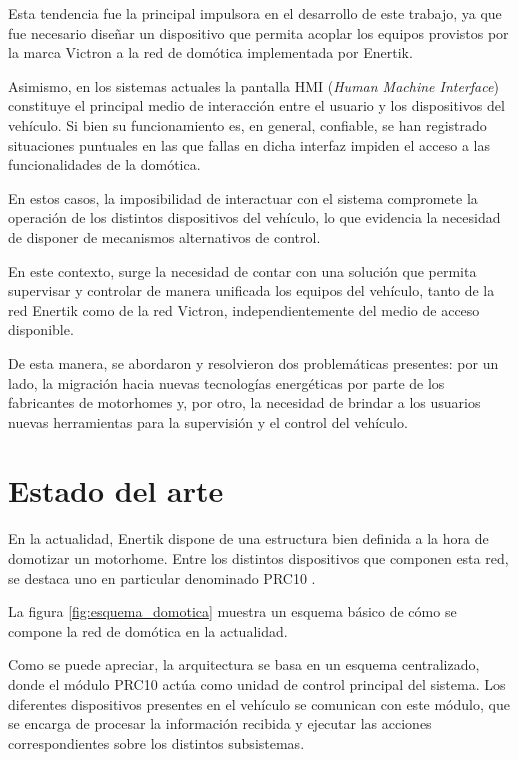 Esta tendencia fue la principal impulsora en el desarrollo de este trabajo, ya que fue necesario diseñar un
dispositivo que permita acoplar los equipos provistos por la marca Victron a la red de domótica implementada por Enertik.

Asimismo, en los sistemas actuales la pantalla HMI (\textit{Human Machine Interface}) constituye el principal medio de interacción entre el usuario y los dispositivos del vehículo. Si bien su funcionamiento es, en general, confiable, se han registrado situaciones puntuales en las que fallas en dicha interfaz impiden el acceso a las funcionalidades de la domótica. 

En estos casos, la imposibilidad de interactuar con el sistema compromete la operación de los distintos dispositivos del vehículo, lo que evidencia la necesidad de disponer de mecanismos alternativos de control.

En este contexto, surge la necesidad de contar con una solución que permita supervisar y controlar de manera unificada los equipos del vehículo, tanto de la red Enertik como de la red Victron, independientemente del medio de acceso disponible.

De esta manera, se abordaron y resolvieron dos problemáticas presentes: por un lado, la migración hacia nuevas tecnologías energéticas por parte de los fabricantes de motorhomes y, por otro, la necesidad de brindar a los usuarios nuevas herramientas para la supervisión y el control del vehículo.

\section{Estado del arte}
\label{sec:1_3}

En la actualidad, Enertik dispone de una estructura bien definida a la hora de domotizar un motorhome. Entre los distintos dispositivos que componen esta red, se destaca uno en particular denominado PRC10 \citep{BOOK:manual_prc10}.

La figura \ref{fig:esquema_domotica} muestra un esquema básico de cómo se compone la red de domótica en la actualidad.

Como se puede apreciar, la arquitectura se basa en un esquema centralizado, donde el módulo PRC10 actúa como unidad de control principal del sistema. Los diferentes dispositivos presentes en el vehículo se comunican con este módulo, que se encarga de procesar la información recibida y ejecutar las acciones correspondientes sobre los distintos subsistemas.

